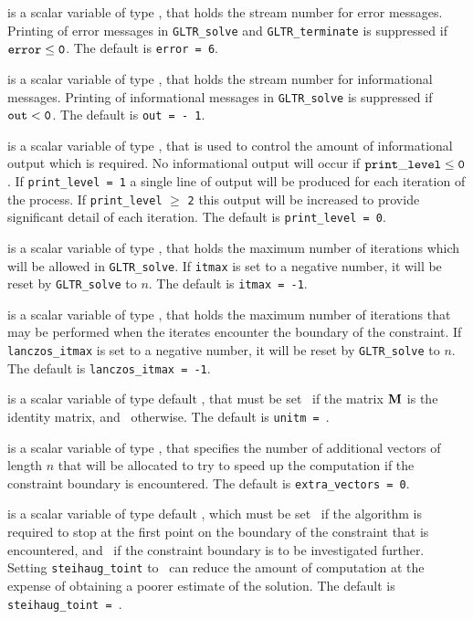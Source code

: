 \documentclass{galahad}
\newcommand{\packagename}{GL\-TR}
\begin{document}
\begin{description}
 is a scalar variable of type \integer, that holds the
stream number for error messages.
Printing of error messages in
{\tt \packagename\_solve} and {\tt \packagename\_terminate}
is suppressed if ${\tt error} \leq {\tt 0}$.
The default is {\tt error = 6}.

 is a scalar variable of type \integer, that holds the
stream number for informational messages.
Printing of informational messages in
{\tt \packagename\_solve} is suppressed if ${\tt out} < {\tt 0}$.
The default is {\tt out = - 1}.

 is a scalar variable of type \integer,
that is used
to control the amount of informational output which is required. No
informational output will occur if ${\tt print\_level} \leq {\tt 0}$. If
{\tt print\_level = 1} a single line of output will be produced for each
iteration of the process. If {\tt print\_level} $\geq$ {\tt 2} this output
will be increased to provide significant detail of each iteration.
The default is {\tt print\_level = 0}.

 is a scalar variable of type \integer, that holds the
maximum number of iterations which will be allowed in
{\tt \packagename\_solve}.
If {\tt itmax} is set to a negative number, it will be reset by
{\tt \packagename\_solve} to $n$.
The default is {\tt itmax = -1}.

 is a scalar variable of type \integer,
that holds the
maximum number of iterations that may be performed when the iterates
encounter the boundary of the constraint.
If {\tt lanczos\_itmax} is set to a negative number, it will be reset by
{\tt \packagename\_solve} to $n$.
The default is {\tt lanczos\_itmax = -1}.

 is a scalar variable of type default \logical, that
must be set \true\ if the matrix ${\mathbf{M}}$ is the identity matrix, and
\false\
otherwise.
The default is {\tt unitm = \true}.

 is a scalar variable of type \integer,
that specifies the number of additional vectors of length $n$
that will be allocated to try to speed up the computation if the
constraint boundary  is encountered.
The default is {\tt extra\_vectors = 0}.

 is a scalar variable of type default \logical,
which must be set \true\ if the algorithm is required to stop at
the first point on the boundary of the constraint that is encountered,
and \false\  if the constraint boundary is to be investigated
further.  Setting {\tt steihaug\_toint} to \true\ can reduce the
amount of computation at the expense of obtaining a poorer estimate of
the solution.
The default is {\tt steihaug\_toint = \false}.


\end{description}
\end{document}
